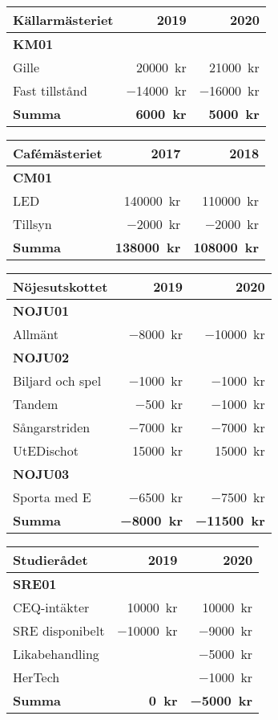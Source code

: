 \documentclass[../_main/handlingar.tex]{subfiles}
\begin{document}
\begin{tabularx}{10cm}{X r r}
    \textbf{\large Källarmästeriet} & \textbf{2019} & \textbf{2020} \\
    \hline
    \textbf{KM01} \\
    Gille & \SI{20000}{kr} & \SI{21000}{kr} \\
    Fast tillstånd & \SI{-14000}{kr} & \SI{-16000}{kr} \\
    \hline
    \textbf{Summa} & \textbf{\SI{6000}{kr}} & \textbf{\SI{5000}{kr}} \\
\end{tabularx}

\begin{tabularx}{10cm}{X r r}
    \textbf{\large Cafémästeriet} & \textbf{2017} & \textbf{2018} \\
    \hline
    \textbf{CM01} \\
    LED & \SI{140000}{kr} & \SI{110000}{kr} \\
    Tillsyn & \SI{-2000}{kr} & \SI{-2000}{kr} \\
    \hline
    \textbf{Summa} & \textbf{\SI{138000}{kr}} & \textbf{\SI{108000}{kr}} \\
\end{tabularx}

\begin{tabularx}{10cm}{X r r}
    \textbf{\large Nöjesutskottet} & \textbf{2019} & \textbf{2020} \\
    \hline
    \textbf{NOJU01} \\
    Allmänt & \SI{-8000}{kr} & \SI{-10000}{kr} \\
    \textbf{NOJU02} \\
    Biljard och spel & \SI{-1000}{kr} & \SI{-1000}{kr} \\
    Tandem & \SI{-500}{kr} & \SI{-1000}{kr} \\
    Sångarstriden & \SI{-7000}{kr} & \SI{-7000}{kr} \\
    UtEDischot & \SI{15000}{kr} & \SI{15000}{kr} \\
    \textbf{NOJU03} \\
    Sporta med E & \SI{-6500}{kr} & \SI{-7500}{kr} \\
    \hline
    \textbf{Summa} & \textbf{\SI{-8000}{kr}} & \textbf{\SI{-11500}{kr}} \\
\end{tabularx}

\begin{tabularx}{10cm}{X r r}
    \textbf{\large Studierådet} & \textbf{2019} & \textbf{2020} \\
    \hline
    \textbf{SRE01} \\
    CEQ-intäkter & \SI{10000}{kr} & \SI{10000}{kr} \\
    SRE disponibelt & \SI{-10000}{kr} & \SI{-9000}{kr} \\
    Likabehandling & & \SI{-5000}{kr} \\
    HerTech & & \SI{-1000}{kr} \\
    \hline
    \textbf{Summa} & \textbf{\SI{0}{kr}} & \textbf{\SI{-5000}{kr}} \\
\end{tabularx}
\end{document}
